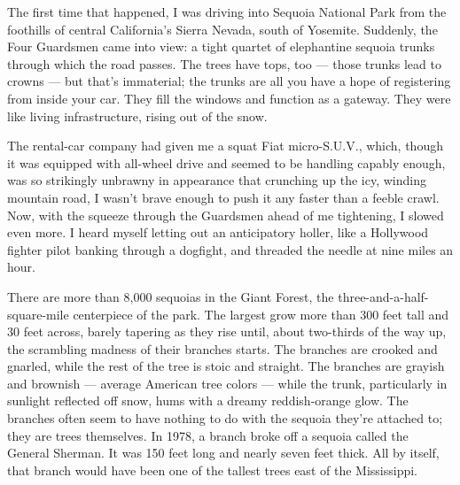 The first time that happened, I was driving into Sequoia National Park
from the foothills of central California's Sierra Nevada, south of
Yosemite. Suddenly, the Four Guardsmen came into view: a tight quartet
of elephantine sequoia trunks through which the road passes. The trees
have tops, too --- those trunks lead to crowns --- but that's
immaterial; the trunks are all you have a hope of registering from
inside your car. They fill the windows and function as a gateway. They
were like living infrastructure, rising out of the snow.

The rental-car company had given me a squat Fiat micro-S.U.V., which,
though it was equipped with all-wheel drive and seemed to be handling
capably enough, was so strikingly unbrawny in appearance that crunching
up the icy, winding mountain road, I wasn't brave enough to push it any
faster than a feeble crawl. Now, with the squeeze through the Guardsmen
ahead of me tightening, I slowed even more. I heard myself letting out
an anticipatory holler, like a Hollywood fighter pilot banking through a
dogfight, and threaded the needle at nine miles an hour.

There are more than 8,000 sequoias in the Giant Forest, the
three-and-a-half-square-mile centerpiece of the park. The largest grow
more than 300 feet tall and 30 feet across, barely tapering as they rise
until, about two-thirds of the way up, the scrambling madness of their
branches starts. The branches are crooked and gnarled, while the rest of
the tree is stoic and straight. The branches are grayish and brownish
--- average American tree colors --- while the trunk, particularly in
sunlight reflected off snow, hums with a dreamy reddish-orange glow. The
branches often seem to have nothing to do with the sequoia they're
attached to; they are trees themselves. In 1978, a branch broke off a
sequoia called the General Sherman. It was 150 feet long and nearly
seven feet thick. All by itself, that branch would have been one of the
tallest trees east of the Mississippi.

